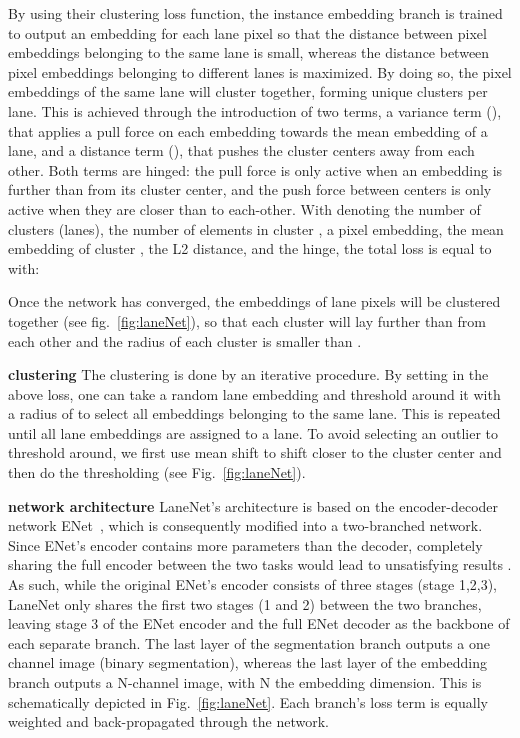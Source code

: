 \documentclass[letterpaper, 10 pt, conference]{ieeeconf}
\begin{document}
By using their clustering loss function, the instance embedding branch is trained to output an embedding for each lane pixel so that the distance between pixel embeddings belonging to the same lane is small, whereas the distance between pixel embeddings belonging to different lanes is maximized. By doing so, the pixel embeddings of the same lane will cluster together, forming unique clusters per lane. This is achieved through the introduction of two terms, a variance term (), that applies a pull force on each embedding towards the mean embedding of a lane, and a distance term (), that pushes the cluster centers away from each other. Both terms are hinged: the pull force is only active when an embedding is further than  from its cluster center, and the push force between centers is only active when they are closer than  to each-other. With  denoting the number of clusters (lanes),  the number of elements in cluster ,  a pixel embedding,  the mean embedding of cluster ,  the L2 distance, and  the hinge, the total loss  is equal to  with: 



Once the network has converged, the embeddings of lane pixels will be clustered together (see fig.~\ref{fig:laneNet}), so that each cluster will lay further than  from each other and the radius of each cluster is smaller than .

\textbf{clustering} The clustering is done by an iterative procedure. By setting  in the above loss, one can take a random lane embedding and threshold around it with a radius of  to select all embeddings belonging to the same lane. This is repeated until all lane embeddings are assigned to a lane. To avoid selecting an outlier to threshold around, we first use mean shift to shift closer to the cluster center and then do the thresholding (see Fig.~\ref{fig:laneNet}). 

\textbf{network architecture} LaneNet's architecture is based on the encoder-decoder network ENet~\cite{Paszke16}, which is consequently modified into a two-branched network. Since ENet's encoder contains more parameters than the decoder, completely sharing the full encoder between the two tasks would lead to unsatisfying results \cite{Neven17}. As such, while the original ENet's encoder consists of three stages (stage 1,2,3), LaneNet only shares the first two stages (1 and 2) between the two branches, leaving stage 3 of the ENet encoder and the full ENet decoder as the backbone of each separate branch. The last layer of the segmentation branch outputs a one channel image (binary segmentation), whereas the last layer of the embedding branch outputs a N-channel image, with N the embedding dimension. This is schematically depicted in Fig.~\ref{fig:laneNet}. Each branch's loss term is equally weighted and back-propagated through the network.
\end{document}
